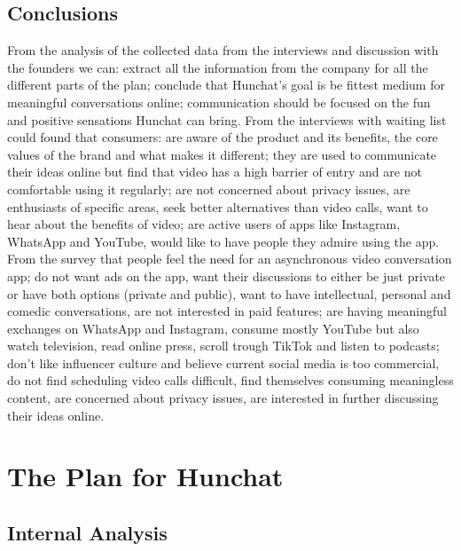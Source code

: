 \documentclass[12pt]{article}
\begin{document}
\subsection{Conclusions}\label{meth:conclusions}
From the analysis of the collected data from the interviews and discussion with the founders we can: extract all the information from the company for all the different parts of the plan; conclude that Hunchat's goal is be fittest medium for meaningful conversations online; communication should be focused on the fun and positive sensations Hunchat can bring. From the interviews with waiting list could found that consumers: are aware of the product and its benefits, the core values of the brand and what makes it different; they are used to communicate their ideas online but find that video has a high barrier of entry and are not comfortable using it regularly; are not concerned about privacy issues, are enthusiasts of specific areas, seek better alternatives than video calls, want to hear about the benefits of video; are active users of apps like Instagram, WhatsApp and YouTube, would like to have people they admire using the app. From the survey that people feel the need for an asynchronous video conversation app; do not want ads on the app, want their discussions to either be just private or have both options (private and public), want to have intellectual, personal and comedic conversations, are not interested in paid features; are having meaningful exchanges on WhatsApp and Instagram, consume mostly YouTube but also watch television, read online press, scroll trough TikTok and listen to podcasts; don't like influencer culture and believe current social media is too commercial, do not find scheduling video calls difficult, find themselves consuming meaningless content, are concerned about privacy issues, are interested in further discussing their ideas online.

\pagebreak

\section{The Plan for Hunchat}\label{plan}

\subsection{Internal Analysis}
\end{document}
